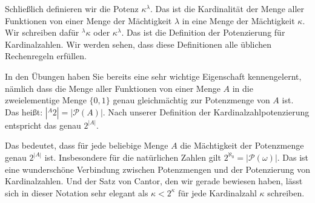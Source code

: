 \begin{spoken-clean}[01:14:20 - 01:16:39]
Schließlich definieren wir die Potenz $\kappa^\lambda$. Das ist die Kardinalität der Menge aller Funktionen von einer Menge der Mächtigkeit $\lambda$ in eine Menge der Mächtigkeit $\kappa$. Wir schreiben dafür ${}^\lambda \kappa$ oder $\kappa^\lambda$. Das ist die Definition der Potenzierung für Kardinalzahlen. Wir werden sehen, dass diese Definitionen alle üblichen Rechenregeln erfüllen.
\end{spoken-clean}

\begin{math-stroke}
\end{math-stroke}

\begin{spoken-clean}[01:16:39 - 01:18:55]
In den Übungen haben Sie bereits eine sehr wichtige Eigenschaft kennengelernt, nämlich dass die Menge aller Funktionen von einer Menge $A$ in die zweielementige Menge $\{0, 1\}$ genau gleichmächtig zur Potenzmenge von $A$ ist. Das heißt: $|{}^A 2| = |\mathcal{P}(A)|$. Nach unserer Definition der Kardinalzahlpotenzierung entspricht das genau $2^{|A|}$.

Das bedeutet, dass für jede beliebige Menge $A$ die Mächtigkeit der Potenzmenge genau $2^{|A|}$ ist. Insbesondere für die natürlichen Zahlen gilt $2^{\aleph_0} = |\mathcal{P}(\omega)|$. Das ist eine wunderschöne Verbindung zwischen Potenzmengen und der Potenzierung von Kardinalzahlen. Und der Satz von Cantor, den wir gerade bewiesen haben, lässt sich in dieser Notation sehr elegant als $\kappa < 2^\kappa$ für jede Kardinalzahl $\kappa$ schreiben.
\end{spoken-clean}


